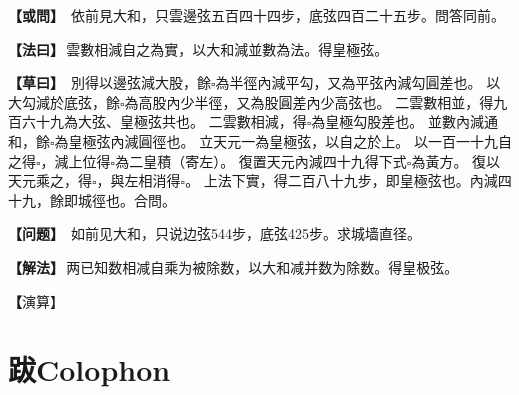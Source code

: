 \documentclass[11pt,a4paper]{article}
\let\origsquare\square
\renewcommand{\square}{\ensuremath{\origsquare}}%
\newcommand{\clOWEN}[1]{%
  \par\vspace{0.3em}%
  \noindent\textcolor{problemcolor}{\textbf{【或問】}}\,{\tradfont #1}\par\nopagebreak%
}
\newcommand{\mdOWEN}[1]{%
  \par\vspace{0.3em}%
  \noindent\textcolor{problemcolor}{\textbf{【问题】}}\,{\modfont #1}\par\nopagebreak%
}
\newcommand{\clFAYUE}[1]{%
  \par\noindent\textcolor{methodcolor}{\textbf{【法曰】}}\,{\tradfont #1}\par\nopagebreak%
}
\newcommand{\mdFAYUE}[1]{%
  \par\noindent\textcolor{methodcolor}{\textbf{【解法】}}\,{\modfont #1}\par\nopagebreak%
}
\newcommand{\clTSAOYUE}[1]{%
  \par\noindent\textcolor{workcolor}{\textbf{【草曰】}}\,{\tradfont #1}\par%
}
\newcommand{\mdTSAOYUE}[1]{%
  \par\noindent\textcolor{workcolor}{\textbf【演算】}}\,{\modfont #1}\par%
\begin{document}
\begin{paracol}{2}

\begin{leftcolumn}
\clOWEN{%
依前見大和，只雲邊弦五百四十四步，底弦四百二十五步。問答同前。}

\clFAYUE{雲數相減自之為實，以大和減並數為法。得皇極弦。}

\clTSAOYUE{%
別得以邊弦減大股，餘$\square$為半徑內減平勾，又為平弦內減勾圓差也。
以大勾減於底弦，餘$\square$為高股內少半徑，又為股圓差內少高弦也。
二雲數相並，得九百六十九為大弦、皇極弦共也。
二雲數相減，得$\square$為皇極勾股差也。
並數內減通和，餘$\square$為皇極弦內減圓徑也。
立天元一為皇極弦，以自之於上。
以一百一十九自之得$\square$，減上位得$\square$為二皇積（寄左）。
復置天元內減四十九得下式$\square$為黃方。
復以天元乘之，得$\square$，與左相消得$\square$。
上法下實，得二百八十九步，即皇極弦也。內減四十九，餘即城徑也。合問。}
\end{leftcolumn}

\switchcolumn

\begin{rightcolumn}
\mdOWEN{%
如前见大和，只说边弦544步，底弦425步。求城墙直径。}

\mdFAYUE{两已知数相减自乘为被除数，以大和减并数为除数。得皇极弦。}

\mdTSAOYUE{%
辨识得：以边弦减大股余$\square$为半径内减平勾，又为平弦内减勾圆差。
以大勾减于底弦余$\square$为高股内少半径，又为股圆差内少高弦。
两已知数相并得969为大弦、皇极弦之和。
两已知数相减得$\square$为皇极勾股之差。
并数内减通和余$\square$为皇极弦内减圆径。
设天元一为皇极弦，自乘于上位。
以119自乘得$\square$，减上位得$\square$为两倍皇极积（寄左）。
再取天元内减49得下式$\square$为黄方。
再以天元乘之得$\square$，与左式相消得$\square$。
上法下实，得289步即皇极弦。内减49余即城径。符合所问。}
\end{rightcolumn}

\end{paracol}

\newpage

\section*{跋\quad Colophon}
\end{document}
